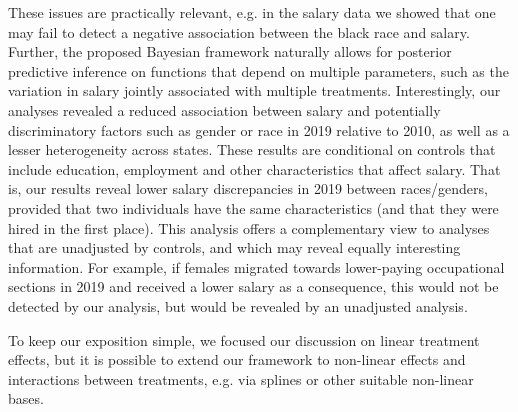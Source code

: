 \documentclass[12pt]{article}
\begin{document}
These issues are practically relevant, e.g. in the salary data we showed that one may fail to detect a negative association between the black race and salary. Further, the proposed Bayesian framework naturally allows for posterior predictive inference on functions that depend on multiple parameters, such as the variation in salary jointly associated with multiple treatments. Interestingly, our analyses revealed a reduced association between salary and potentially discriminatory factors such as gender or race in 2019 relative to 2010, as well as a lesser heterogeneity across states.
These results are conditional on controls that include education, employment and other characteristics that affect salary. That is, our results reveal lower salary discrepancies in 2019 between races/genders, provided that two individuals have the same characteristics (and that they were hired in the first place).
This analysis offers a complementary view to analyses that are unadjusted by controls, and which may reveal equally interesting information.
For example, if females migrated towards lower-paying occupational sections in 2019 and received a lower salary as a consequence, this would not be detected by our analysis, but would be revealed by an unadjusted analysis.

To keep our exposition simple, we focused our discussion on linear treatment effects, but it is possible to extend our framework to non-linear effects and interactions between treatments, e.g. via splines or other suitable non-linear bases.


%
\end{document}
